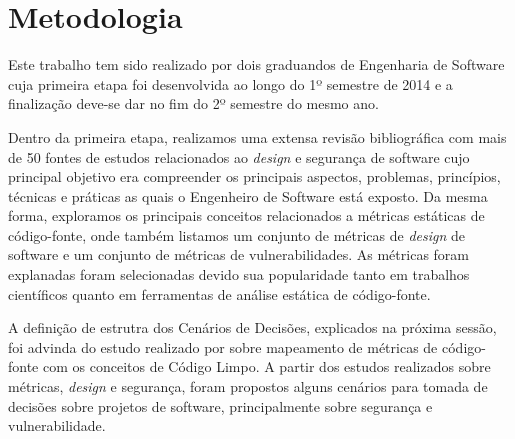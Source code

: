 \section{Metodologia}
\label{sec:methodology}

Este trabalho tem sido realizado por dois graduandos de Engenharia de Software cuja primeira etapa foi desenvolvida ao longo do 1º semestre de 2014 e a finalização deve-se dar no fim do 2º semestre do mesmo ano.
%

Dentro da primeira etapa, realizamos uma extensa revisão bibliográfica com mais de 50 fontes de estudos relacionados ao \emph{design} e segurança de software cujo principal objetivo era compreender os principais aspectos, problemas, princípios, técnicas e práticas as quais o Engenheiro de Software está exposto. Da mesma forma, exploramos os principais conceitos relacionados a métricas estáticas de código-fonte, onde também listamos um conjunto de métricas de \emph{design} de software e um conjunto de métricas de vulnerabilidades. As métricas foram explanadas foram selecionadas devido sua popularidade tanto em trabalhos científicos quanto em ferramentas de análise estática de código-fonte.

A definição de estrutra dos Cenários de Decisões, explicados na próxima sessão, foi advinda do estudo realizado por \cite{almeida2010} sobre mapeamento de métricas de código-fonte com os conceitos de Código Limpo. A partir dos estudos realizados sobre métricas, \emph{design} e segurança, foram propostos alguns cenários para tomada de decisões sobre projetos de software, principalmente sobre segurança e vulnerabilidade.
